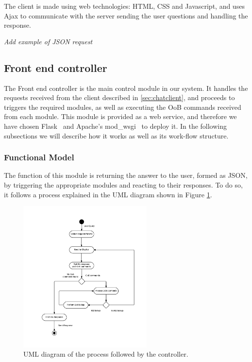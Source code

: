 The client is made using web technologies: HTML, CSS and Javascript, and uses Ajax to communicate with the server sending the user questions and handling the response.

\emph{Add example of JSON request}



\subsection{Front end controller}
\label{sec:frontendcon}
The Front end controller is the main control module in our system. It handles the requests received from the client described in \ref{sec:chatclient}, and proceeds to triggers the required modules, as well as executing the \ac{OoB} commands received from each module. This module is provided as a web service, and therefore we have chosen Flask~\cite{flask0101} and Apache's mod\_wsgi~\cite{modwsgi} to deploy it. In the following subsections we will describe how it works as well as its work-flow structure.

\subsubsection{Functional Model}

The function of this module is returning the answer to the user, formed as JSON, by triggering the appropriate modules and reacting to their responses. To do so, it follows a process explained in the UML diagram shown in Figure \ref{fig:fe-model1}.

\begin{figure}[!htbp]
    \centering
    \includegraphics[width=0.6\textwidth]{img/prot/activityDiagram.png} 
    \caption{UML diagram of the process followed by the controller.}
    \label{fig:fe-model1}
\end{figure}

